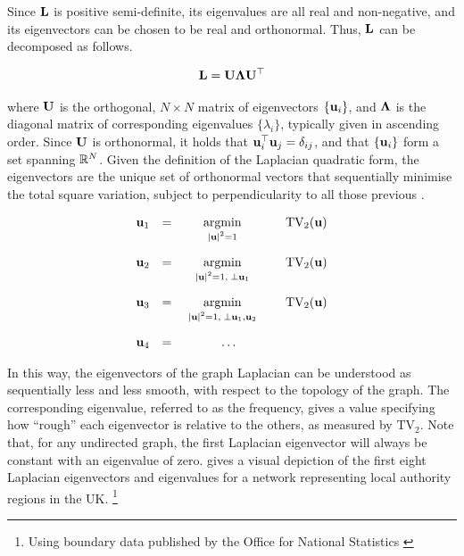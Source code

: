 Since $\mathbf{L}$ is positive semi-definite, its eigenvalues are all real and non-negative, and its eigenvectors can be chosen to be real and orthonormal. Thus, $\mathbf{L}$ can be decomposed as follows. 

\begin{equation}
    \mathbf{L} = \mathbf{U} \mathbf{\Lambda} \mathbf{U}^\top
\end{equation}

where $\mathbf{U}$ is the orthogonal, $N \times N$ matrix of eigenvectors $\{\mathbf{u}_i\}$, and $\mathbf{\Lambda}$ is the diagonal matrix of corresponding eigenvalues $\{\lambda_i\}$, typically given in ascending order. Since $\mathbf{U}$ is orthonormal, it holds that $\mathbf{u}_i^\top \mathbf{u}_j = \delta_{ij}$, and that $\{\mathbf{u}_i\}$ form a set spanning $\mathbb{R}^N$. Given the definition of the Laplacian quadratic form, the eigenvectors are the unique set of orthonormal vectors that sequentially minimise the total square variation, subject to perpendicularity to all those previous \citep{Spielman2019}. 


$$
\begin{matrix}
    \uu_1 & = & \underset{\raisebox{-0.1cm} { $ \scriptstyle |\uu|^2 = 1$ }}{\text{argmin}} \quad & \text{TV}_2(\uu) \\[0.7cm]
    \uu_2 & = & \underset{\raisebox{-0.1cm} { $ \scriptstyle |\uu|^2 = 1, \; \perp \uu_1$ }}{\text{argmin}} \quad & \text{TV}_2(\uu) \\[0.7cm]
    \uu_3 & = & \underset{\raisebox{-0.1cm} { $ \scriptstyle |\uu|^2 = 1, \;\perp \uu_1, \uu_2$ }}{\text{argmin}} \quad & \text{TV}_2(\uu) \\[0.7cm]
    \uu_4 & = & \ldots
\end{matrix}
$$

\newpage

In this way, the eigenvectors of the graph Laplacian can be understood as sequentially less and less smooth, with respect to the topology of the graph. The corresponding eigenvalue, referred to as the frequency, gives a value specifying how ``rough'' each eigenvector is relative to the others, as measured by $\text{TV}_2$. Note that, for any undirected graph, the first Laplacian eigenvector will always be constant with an eigenvalue of zero.  gives a visual depiction of the first eight Laplacian eigenvectors and eigenvalues for a network representing local authority regions in the UK. \footnote{Using boundary data published by the Office for National Statistics \citep{ONS2019}}  


